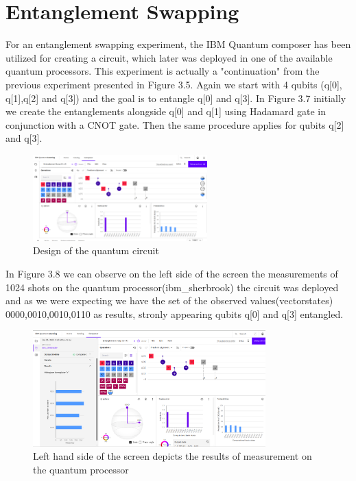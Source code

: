 \documentclass[12pt,a4paper] {report}
\begin{document}
		\section{Entanglement Swapping}

		For an entanglement swapping experiment, the IBM Quantum composer has been utilized for creating a circuit, which later
		was deployed in one of the available quantum processors. This experiment is actually a "continuation" from the 
		previous experiment presented in Figure 3.5. Again we start with 4 qubits (q[0], q[1],q[2] and q[3]) and the goal is to entangle
		q[0] and q[3]. In Figure 3.7 initially we create the entanglements alongside q[0] and q[1] using Hadamard gate in conjunction with
		a CNOT gate. Then the same procedure applies for qubits q[2] and q[3].

		\begin{figure}[h!]
			\centering
			\includegraphics[width=0.6\textwidth]{ibmq/a.png}
			\caption{Design of the quantum circuit}
			\label{fig:}
		\end{figure}		
		

		In Figure 3.8 we can observe on the left side of the screen the measurements of 1024 shots on the quantum processor(ibm\_sherbrook)
		the circuit was deployed and as we were expecting we have the set of the observed values(vectorstates)
		0000,0010,0010,0110 as results, stronly appearing qubits q[0] and q[3] entangled.

		\begin{figure}[h!]
			\centering
			\includegraphics[width=0.8\textwidth]{ibmq/b.png}
			\caption{Left hand side of the screen depicts the results of measurement on the quantum processor}
			\label{fig:}
		\end{figure}		
	
\end{document}
